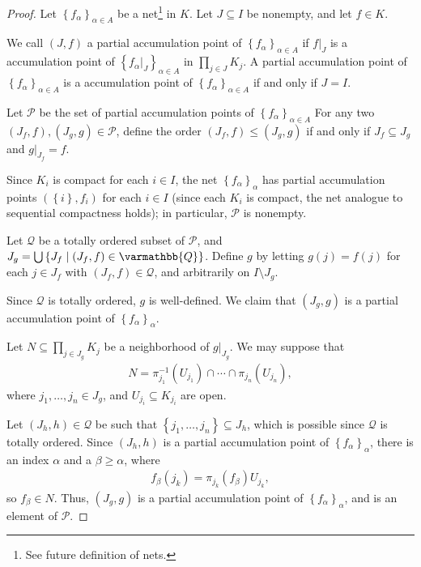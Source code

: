 \documentclass[10pt]{extarticle}
\newcommand{\Q}{\mathbb{Q}}
\newcommand{\set}[1]{\left\{#1\right\}}
\theoremstyle{plain}
\theoremstyle{definition}
\theoremstyle{note}
\renewcommand*{\mathbb}[1]{\varmathbb{#1}}
\renewcommand{\newline}{\hfill\break}
\begin{document}
\begin{proof}
  Let $\set{f_{\alpha}}_{\alpha\in A}$ be a net\footnote{See future definition of nets.} in $K$. Let $J\subseteq I$ be nonempty, and let $f\in K$.\newline

  We call $\left(J,f\right)$ a partial accumulation point of $\set{f_{\alpha}}_{\alpha \in A}$ if $f\vert_{J}$ is a accumulation point of $\set{f_{\alpha}\vert_{J}}_{\alpha \in A}$ in $\displaystyle \prod_{j\in J}K_j$. A partial accumulation point of $\set{f_{\alpha}}_{\alpha \in A}$ is a accumulation point of $\set{f_{\alpha}}_{\alpha\in A}$  if and only if $J = I$.\newline

  Let $\mathcal{P}$ be the set of partial accumulation points of $\set{f_{\alpha}}_{\alpha \in A}$ For any two $\left(J_f,f\right),\left(J_g,g\right)\in \mathcal{P}$, define the order $\left(J_f,f\right)\leq \left(J_g,g\right)$ if and only if $J_f\subseteq J_g$ and $g\vert_{J_f} = f$.\newline

  Since $K_i$ is compact for each $i\in I$, the net $\set{f_{\alpha}}_{\alpha}$ has partial accumulation points $\left(\set{i},f_i\right)$ for each $i\in I$ (since each $K_i$ is compact, the net analogue to sequential compactness holds); in particular, $\mathcal{P}$ is nonempty.\newline

  Let $\mathcal{Q}$ be a totally ordered subset of $\mathcal{P}$, and $J_g = \bigcup\set{J_f\mid \left(J_f,f\right)\in \Q}$. Define $g$ by letting $g(j) = f(j)$ for each $j\in J_f$ with $\left(J_f,f\right)\in \mathcal{Q}$, and arbitrarily on $I\setminus J_g$.\newline

  Since $\mathcal{Q}$ is totally ordered, $g$ is well-defined. We claim that $\left(J_g,g\right)$ is a partial accumulation point of $\set{f_{\alpha}}_{\alpha}$.\newline

  Let $\displaystyle N\subseteq \prod_{j\in J_g} K_j$ be a neighborhood of $g\vert_{J_g}$. We may suppose that
  \begin{align*}
    N = \pi_{j_1}^{-1}\left(U_{j_1}\right) \cap \cdots \cap \pi_{j_n}\left(U_{j_n}\right),
  \end{align*}
  where $j_1,\dots,j_n\in J_g$, and $U_{j_i} \subseteq K_{j_i}$ are open.\newline

  Let $\left(J_{h},h\right)\in \mathcal{Q}$ be such that $\set{j_1,\dots,j_n}\subseteq J_h$, which is possible since $\mathcal{Q}$ is totally ordered. Since $\left(J_h,h\right)$ is a partial accumulation point of $\set{f_{\alpha}}_{\alpha}$, there is an index $\alpha$ and a $\beta \geq \alpha$, where
  \begin{align*}
    f_{\beta}\left(j_k\right) = \pi_{j_k}\left(f_{\beta}\right)U_{j_k},
  \end{align*}
  so $f_{\beta}\in N$. Thus, $\left(J_g,g\right)$ is a partial accumulation point of $\set{f_{\alpha}}_{\alpha}$, and is an element of $\mathcal{P}$.\newline


\end{proof}
\end{document}
